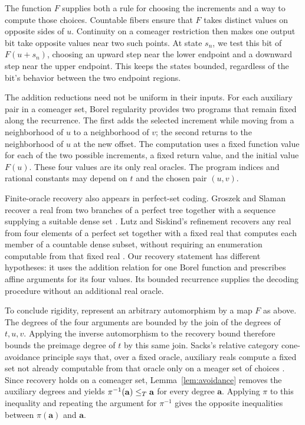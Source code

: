 The function $F$ supplies both a rule for choosing the increments
and a way to compute those choices. Countable fibers ensure that
$F$ takes distinct values on opposite sides of $u$. Continuity
on a comeager restriction then makes one output bit take opposite
values near two such points. At state $s_n$, we test this bit of
$F(u+s_n)$, choosing an upward step near the lower endpoint and
a downward step near the upper endpoint. This keeps the states
bounded, regardless of the bit's behavior between the two
endpoint regions.

The addition reductions need not be uniform in their inputs.
For each auxiliary pair in a comeager set, Borel regularity
provides two programs that remain fixed along the recurrence.
The first adds the selected increment while moving from a
neighborhood of $u$ to a neighborhood of $v$; the second returns
to the neighborhood of $u$ at the new offset. The computation uses a
fixed function value for each of the two possible increments,
a fixed return value, and the initial value $F(u)$.
These four values are its only real oracles. The program indices
and rational constants may depend on $t$ and the chosen pair
$(u,v)$.

Finite-oracle recovery also appears in perfect-set coding.
Groszek and Slaman recover a real from two branches of a perfect
tree together with a sequence supplying a suitable dense set
\cite[Lemma~2.2, author's version]{GroszekSlaman1998}.
Lutz and Siskind's refinement
recovers any real from four elements of a perfect set together
with a fixed real that computes each member of a countable dense
subset, without requiring an enumeration computable from that
fixed real
\cite[Theorem~4.3, arXiv version]{LutzSiskind2025}.
Our recovery statement has different hypotheses: it uses the
addition relation for one Borel function and prescribes affine
arguments for its four values. Its bounded recurrence supplies
the decoding procedure without an additional real oracle.

To conclude rigidity, represent an arbitrary automorphism by a
map $F$ as above. The degrees of the four arguments are bounded by
the join of the degrees of $t,u,v$. Applying the inverse
automorphism to the recovery bound therefore bounds the preimage
degree of $t$ by this same join. Sacks's relative category
cone-avoidance principle says that, over a fixed oracle,
auxiliary reals compute a fixed set not already computable from
that oracle only on a meager set of choices
\cite[Lemma~4.1]{KumarShelah2023}. Since recovery holds on a
comeager set, Lemma~\ref{lem:avoidance} removes the auxiliary
degrees and yields $\pi^{-1}(\mathbf a)\le_T\mathbf a$ for every
degree $\mathbf a$. Applying $\pi$ to this inequality and repeating
the argument for $\pi^{-1}$ gives the opposite inequalities between
$\pi(\mathbf a)$ and $\mathbf a$.

